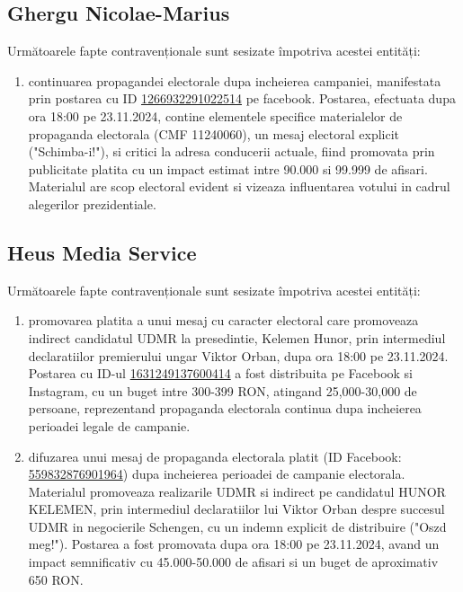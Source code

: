 \documentclass[a4paper,12pt]{article}
\begin{document}
\vspace{0.5cm}

\subsection{Ghergu Nicolae-Marius}
Următoarele fapte contravenționale sunt sesizate împotriva acestei entități:

\begin{enumerate}[leftmargin=*, label=\arabic*.)]
    \item continuarea propagandei electorale dupa incheierea campaniei, manifestata prin postarea cu ID \href{https://www.facebook.com/ads/library/?id=1266932291022514}{1266932291022514} pe facebook. Postarea, efectuata dupa ora 18:00 pe 23.11.2024, contine elementele specifice materialelor de propaganda electorala (CMF 11240060), un mesaj electoral explicit ("Schimba-i!"), si critici la adresa conducerii actuale, fiind promovata prin publicitate platita cu un impact estimat intre 90.000 si 99.999 de afisari. Materialul are scop electoral evident si vizeaza influentarea votului in cadrul alegerilor prezidentiale.
\end{enumerate}

\vspace{0.5cm}

\subsection{Heus Media Service}
Următoarele fapte contravenționale sunt sesizate împotriva acestei entități:

\begin{enumerate}[leftmargin=*, label=\arabic*.)]
    \item promovarea platita a unui mesaj cu caracter electoral care promoveaza indirect candidatul UDMR la presedintie, Kelemen Hunor, prin intermediul declaratiilor premierului ungar Viktor Orban, dupa ora 18:00 pe 23.11.2024. Postarea cu ID-ul \href{https://www.facebook.com/ads/library/?id=1631249137600414}{1631249137600414} a fost distribuita pe Facebook si Instagram, cu un buget intre 300-399 RON, atingand 25,000-30,000 de persoane, reprezentand propaganda electorala continua dupa incheierea perioadei legale de campanie.
    \item difuzarea unui mesaj de propaganda electorala platit (ID Facebook: \href{https://www.facebook.com/ads/library/?id=559832876901964}{559832876901964}) dupa incheierea perioadei de campanie electorala. Materialul promoveaza realizarile UDMR si indirect pe candidatul HUNOR KELEMEN, prin intermediul declaratiilor lui Viktor Orban despre succesul UDMR in negocierile Schengen, cu un indemn explicit de distribuire ("Oszd meg!"). Postarea a fost promovata dupa ora 18:00 pe 23.11.2024, avand un impact semnificativ cu 45.000-50.000 de afisari si un buget de aproximativ 650 RON.
\end{enumerate}
\end{document}
